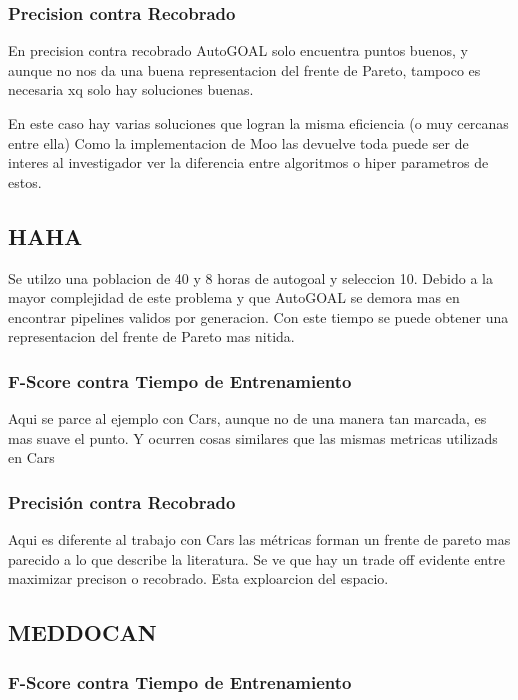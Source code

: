 \subsubsection{Precision contra Recobrado}

En precision contra recobrado AutoGOAL solo encuentra puntos buenos, y aunque no nos da una buena representacion del frente de Pareto, tampoco es necesaria xq solo hay soluciones buenas.

En este caso hay varias soluciones que logran la misma eficiencia (o muy cercanas entre ella) Como la implementacion de Moo las devuelve toda puede ser de interes al investigador ver la diferencia entre algoritmos o hiper parametros de estos.

\subsection{HAHA}

Se utilzo una poblacion de 40 y 8 horas de autogoal y seleccion 10. Debido a la mayor complejidad de este problema y que AutoGOAL se demora mas en encontrar pipelines validos por generacion. Con este tiempo se puede obtener una representacion del frente de Pareto mas nitida.

\subsubsection{F-Score contra Tiempo de Entrenamiento}

Aqui se parce al ejemplo con Cars, aunque no de una manera tan marcada, es mas suave el punto. Y ocurren cosas similares que las mismas metricas utilizads en Cars

\subsubsection{Precisi\'on contra Recobrado}

Aqui es diferente al trabajo con Cars las m\'etricas forman un frente de pareto mas parecido a lo que describe la literatura. Se ve que hay un trade off evidente entre maximizar precison o recobrado. Esta exploarcion del espacio.

\subsection{MEDDOCAN}

\subsubsection{F-Score contra Tiempo de Entrenamiento}

